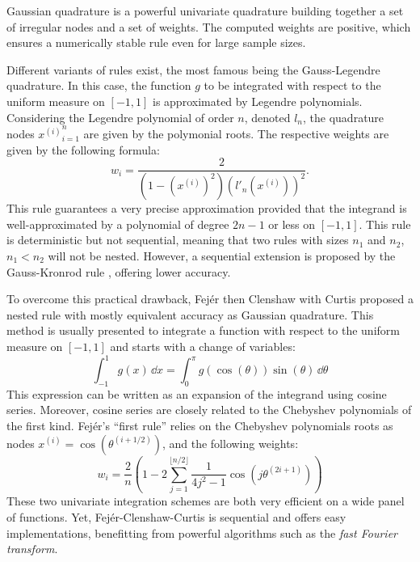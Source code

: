 Gaussian quadrature is a powerful univariate quadrature building together a set of irregular nodes and a set of weights. 
The computed weights are positive, which ensures a numerically stable rule even for large sample sizes.

Different variants of rules exist, the most famous being the Gauss-Legendre quadrature. 
In this case, the function $g$ to be integrated with respect to the uniform measure on $[-1, 1]$ is approximated by Legendre polynomials.
Considering the Legendre polynomial of order $n$, denoted $l_n$, the quadrature nodes ${x^{(i)}}_{i=1}^n$ are given by the polymonial roots.
The respective weights are given by the following formula: 
\begin{equation}
    w_{i}={\frac {2}{\left(1-\left(x^{(i)}\right)^{2}\right)\left(l'_{n}(x^{(i)})\right)^{2}}}.
\end{equation}
This rule guarantees a very precise approximation provided that the integrand is well-approximated by a polynomial of degree $2n-1$ or less on $[-1, 1]$.
This rule is deterministic but not sequential, meaning that two rules with sizes $n_1$ and $n_2$, $n_1 < n_2$ will not be nested. 
However, a sequential extension is proposed by the Gauss-Kronrod rule \citep{laurie_1997}, offering lower accuracy. 

To overcome this practical drawback, Fejér then Clenshaw with Curtis proposed a nested rule with mostly equivalent accuracy as Gaussian quadrature.
This method is usually presented to integrate a function with respect to the uniform measure on $[-1, 1]$ and starts with a change of variables:
\begin{equation}
    \int_{-1}^{1} g(x) \, \dd x = \int_{0}^{\pi} g(\cos(\theta)) \sin(\theta) \, \dd \theta 
\end{equation}
This expression can be written as an expansion of the integrand using cosine series. 
Moreover, cosine series are closely related to the Chebyshev polynomials of the first kind. 
Fejér's ``first rule'' \citep{trefethen_2008} relies on the Chebyshev polynomials roots as nodes $x^{(i)} = \cos(\theta^{(i+1/2)})$, and the following weights:
\begin{equation}
    w_i=\frac{2}{n}\left(1-2\sum_{j=1}^{\lfloor n/2 \rfloor}\frac{1}{4j^2-1}\cos\left(j\theta^{(2i+1)}\right)\right)    
\end{equation}
These two univariate integration schemes are both very efficient on a wide panel of functions. 
Yet, Fejér-Clenshaw-Curtis is sequential and offers easy implementations, benefitting from powerful algorithms such as the \textit{fast Fourier transform}. 

